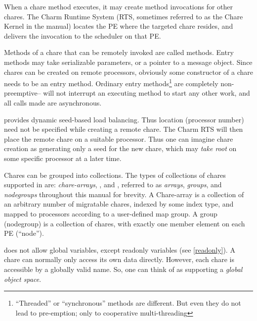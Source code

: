 When a chare method executes, it may create  method invocations for other
chares. The Charm Runtime System (RTS, sometimes referred to as the
Chare Kernel in the manual) locates the PE where the targeted chare
resides, and delivers the invocation to the scheduler on that PE. 

Methods of a chare that can be remotely invoked are called
 methods.  Entry methods may take serializable
parameters, or a pointer to a message object.  Since 
chares can be created on remote processors, obviously some constructor
of a chare needs to be an entry method.  Ordinary entry
methods\footnote{``Threaded'' or ``synchronous'' methods are
different. But even they do not lead to pre-emption; only to
cooperative multi-threading} are completely non-preemptive--
\charm will not interrupt an executing method to start any other work,
and all calls made are asynchronous.

\charm provides dynamic seed-based load balancing. Thus location (processor
number) need not be specified while creating a
remote chare. The Charm RTS will then place the remote
chare on a suitable processor. Thus one can imagine chare creation
as generating only a seed for the new chare, which may {\em take root}
on some specific processor at a later time. 



Chares can be grouped into collections. The types of collections of
chares supported in \charm are: {\em chare-arrays}, , and , referred
to as {\em arrays}, {\em groups}, and {\em nodegroups} throughout this
manual for brevity. A Chare-array is a collection of an arbitrary number
of migratable chares, indexed by some index type, and mapped to
processors according to a user-defined map group. A group (nodegroup)
is a collection of chares, with exactly one member element on each PE
(``node'').

\charm does not allow global variables, except readonly variables
(see \ref{readonly}). A chare can normally only access its own data directly.
However, each chare is accessible by a globally valid name. So, one
can think of \charm as supporting a {\em global object space}.



